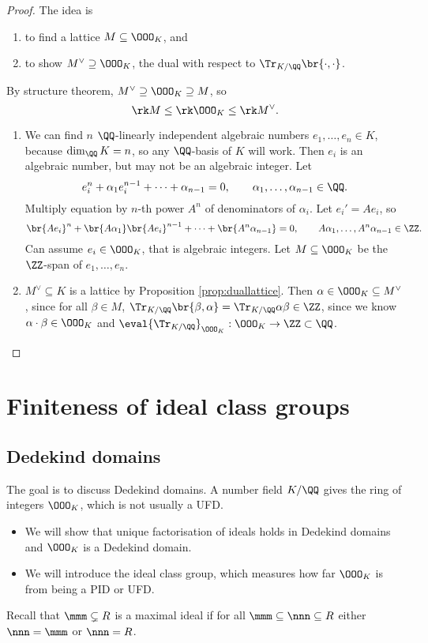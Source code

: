 \begin{proof}
The idea is
\begin{enumerate}
\item to find a lattice $ M \subseteq \OOO_K $, and
\item to show $ M^\vee \supseteq \OOO_K $, the dual with respect to $ \Tr_{K / \QQ}\br{\cdot, \cdot} $.
\end{enumerate}
By structure theorem, $ M^\vee \supseteq \OOO_K \supseteq M $, so
$$ \rk M \le \rk \OOO_K \le \rk M^\vee. $$
\begin{enumerate}
\item We can find $ n $ $ \QQ $-linearly independent algebraic numbers $ e_1, \dots, e_n \in K $, because $ \dim_\QQ K = n $, so any $ \QQ $-basis of $ K $ will work. Then $ e_i $ is an algebraic number, but may not be an algebraic integer. Let
$$ e_i^n + \alpha_1e_i^{n - 1} + \dots + \alpha_{n - 1} = 0, \qquad \alpha_1, \dots, \alpha_{n - 1} \in \QQ. $$
Multiply equation by $ n $-th power $ A^n $ of denominators of $ \alpha_i $. Let $ e_i' = Ae_i $, so
$$ \br{Ae_i}^n + \br{A\alpha_1}\br{Ae_i}^{n - 1} + \dots + \br{A^n\alpha_{n - 1}} = 0, \qquad A\alpha_1, \dots, A^n\alpha_{n - 1} \in \ZZ. $$
Can assume $ e_i \in \OOO_K $, that is algebraic integers. Let $ M \subseteq \OOO_K $ be the $ \ZZ $-span of $ e_1, \dots, e_n $.
\item $ M^\vee \subseteq K $ is a lattice by Proposition \ref{prop:duallattice}. Then $ \alpha \in \OOO_K \subseteq M^\vee $, since for all $ \beta \in M $, $ \Tr_{K / \QQ}\br{\beta, \alpha} = \Tr_{K / \QQ} \alpha\beta \in \ZZ $, since we know $ \alpha \cdot \beta \in \OOO_K $ and $ \eval{\Tr_{K / \QQ}}_{\OOO_K} : \OOO_K \to \ZZ \subset \QQ $.
\end{enumerate}
\end{proof}

\pagebreak

\section{Finiteness of ideal class groups}

\subsection{Dedekind domains}


The goal is to discuss Dedekind domains. A number field $ K / \QQ $ gives the ring of integers $ \OOO_K $, which is not usually a UFD.
\begin{itemize}
\item We will show that unique factorisation of ideals holds in Dedekind domains and $ \OOO_K $ is a Dedekind domain.
\item We will introduce the ideal class group, which measures how far $ \OOO_K $ is from being a PID or UFD.
\end{itemize}
Recall that $ \mmm \subsetneq R $ is a maximal ideal if for all $ \mmm \subseteq \nnn \subseteq R $ either $ \nnn = \mmm $ or $ \nnn = R $.

